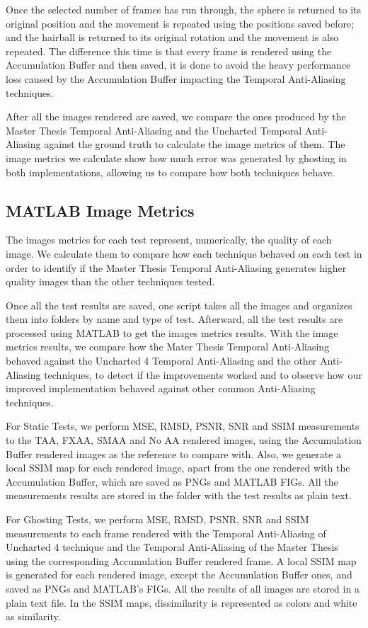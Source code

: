 \documentclass{cslthse-msc}
\begin{document}
Once the selected number of frames has run through, the sphere is returned to its original position and the movement is repeated using the positions saved before; and the hairball is returned to its original rotation and the movement is also repeated. The difference this time is that every frame is rendered using the Accumulation Buffer and then saved, it is done to avoid the heavy performance loss caused by the Accumulation Buffer impacting the Temporal Anti-Aliasing techniques.

After all the images rendered are saved, we compare the ones produced by the Master Thesis Temporal Anti-Aliasing and the Uncharted Temporal Anti-Aliasing against the ground truth to calculate the image metrics of them. The image metrics we calculate show how much error was generated by ghosting in both implementations, allowing us to compare how both techniques behave. 


\subsection{MATLAB Image Metrics}
The images metrics for each test represent, numerically, the quality of each image. We calculate them to compare how each technique behaved on each test in order to identify if the Master Thesis Temporal Anti-Aliasing generates higher quality images than the other techniques tested. 

Once all the test results are saved, one script takes all the images and organizes them into folders by name and type of test. Afterward, all the test results are processed using MATLAB to get the images metrics results. With the image metrics results, we compare how the Mater Thesis Temporal Anti-Aliasing behaved against the Uncharted 4 Temporal Anti-Aliasing and the other Anti-Aliasing techniques, to detect if the improvements worked and to observe how our improved implementation behaved against other common Anti-Aliasing techniques.

For Static Tests, we perform MSE, RMSD, PSNR, SNR and SSIM measurements to the TAA, FXAA, SMAA and No AA rendered images, using the Accumulation Buffer rendered images as the reference to compare with. Also, we generate a local SSIM map for each rendered image, apart from the one rendered with the Accumulation Buffer, which are saved as PNGs and MATLAB FIGs. All the measurements results are stored in the folder with the test results as plain text. 

For Ghosting Tests, we perform MSE, RMSD, PSNR, SNR and SSIM measurements to each frame rendered with the Temporal Anti-Aliasing of Uncharted 4 technique and the Temporal Anti-Aliasing of the Master Thesis using the corresponding Accumulation Buffer rendered frame. A local SSIM map is generated for each rendered image, except the Accumulation Buffer ones, and saved as PNGs and MATLAB's FIGs. All the results of all images are stored in a plain text file. In the SSIM maps, dissimilarity is represented as colors and white as similarity.
\end{document}
